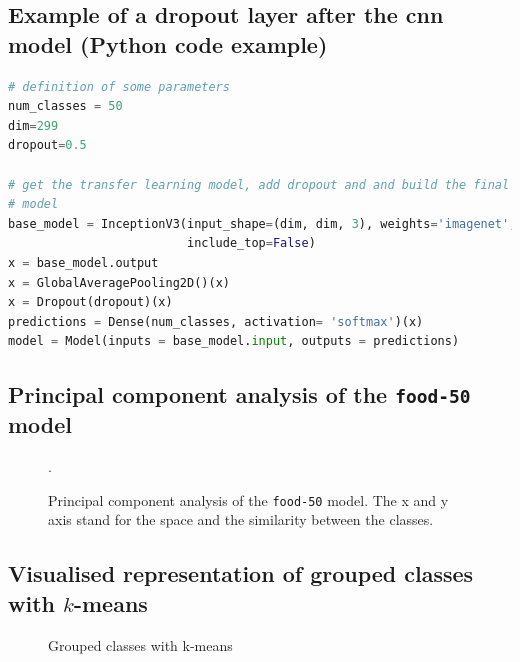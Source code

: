 \documentclass[10pt]{article}
\newcommand\inputpgf[2]{{
\let\pgfimageWithoutPath\pgfimage
\renewcommand{\pgfimage}[2][]{\pgfimageWithoutPath[##1]{#1/##2}}

}}
\begin{document}
			
		\clearpage
		\subsection{Example of a dropout layer after the \ac{cnn} model (Python code example)}
			\begin{lstlisting}[frame=single,caption={Example of a dropout layer after the \ac{cnn} model},captionpos=b,basicstyle=\small,language=Python,label=lst:lstlisting_python_dropout]
# definition of some parameters
num_classes = 50
dim=299
dropout=0.5

# get the transfer learning model, add dropout and and build the final
# model
base_model = InceptionV3(input_shape=(dim, dim, 3), weights='imagenet',
                         include_top=False)
x = base_model.output
x = GlobalAveragePooling2D()(x)
x = Dropout(dropout)(x)
predictions = Dense(num_classes, activation= 'softmax')(x)
model = Model(inputs = base_model.input, outputs = predictions)
			\end{lstlisting}




		\subsection{Principal component analysis of the \texttt{food-50} model}
			\begin{figure}[H]
				\begin{center}
					\scalebox{0.75}{
						\inputpgf{images/pgf}{pca-rotated.pgf}
					}
				\end{center}
				\caption[Principal component analysis of the \texttt{food-50} model]{Principal component analysis of the \texttt{food-50} model. The x and y axis stand for the space and the similarity between the classes.}
				\label{fig:analysis_pca_food_50_big}.
			\end{figure}
			
			
		\clearpage
		\subsection{Visualised representation of grouped classes with \(k\)-means}
			\begin{figure}[H]
				\begin{center}
					\scalebox{0.5}{
						\inputpgf{images/pgf}{pca-grouped.pgf}
					}
				\end{center}
				\caption{Grouped classes with k-means}
				\label{fig:analysis_grouped_classes_with_k_means}
			\end{figure}
\end{document}
